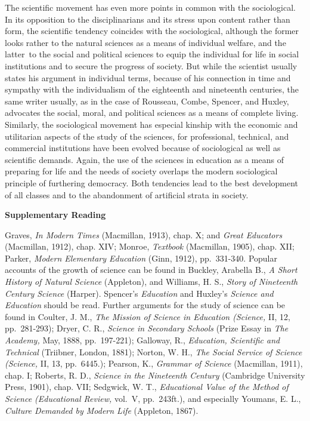 \documentclass[]{book}
\begin{document}
The scientific movement has even more points in common with the sociological. In its opposition to the disciplinarians and its stress upon content rather than form, the scientific tendency coincides with the sociological, although the former looks rather to the natural sciences as a means of individual welfare, and the latter~to the social and political sciences to equip the individual for life in social institutions and to secure the progress of society. But while the scientist usually states his argument in individual terms, because of his connection in time and sympathy with the individualism of the eighteenth and nineteenth centuries, the same writer usually, as in the case of Rousseau, Combe, Spencer, and Huxley, advocates the social, moral, and political sciences as a means of complete living. Similarly, the sociological movement has especial kinship with the economic and utilitarian aspects of the study of the sciences, for professional, technical, and commercial institutions have been evolved because of sociological as well as scientific demands. Again, the use of the sciences in education as a means of preparing for life and the needs of society overlaps the modern sociological principle of furthering democracy. Both tendencies lead to the best development of all classes and to the abandonment of artificial strata in society.

\textbf{Supplementary Reading}

Graves, \emph{In Modern Times} (Macmillan, 1913), chap. X; and \emph{Great Educators} (Macmillan, 1912), chap. XIV; Monroe, \emph{Textbook} (Macmillan, 1905), chap. XII; Parker, \emph{Modern Elementary Education} (Ginn, 1912), pp.~331-340. Popular accounts of the growth of science can be found in Buckley, Arabella B., \emph{A Short History of Natural Science} (Appleton), and Williams, H. S., \emph{Story of Nineteenth Century Science} (Harper). Spencer's \emph{Education} and Huxley's \emph{Science and Education} should be read. Further arguments for the study of science can be found in Coulter, J. M., \emph{The Mission of Science in Education (Science,} II, 12, pp.~281-293); Dryer, C. R., \emph{Science in Secondary Schools} (Prize Essay in \emph{The Academy,} May, 1888, pp.~197-221); Galloway, R., \emph{Education, Scientific and Technical} (Triibner, London, 1881); Norton, W. H., \emph{The Social Service of Science (Science,} II, 13, pp.~6445.); Pearson, K., \emph{Grammar of Science} (Macmillan, 1911), chap. I; Roberts, R. D., \emph{Science in the Nineteenth Century} (Cambridge University Press, 1901), chap. VII; Sedgwick, W. T., \emph{Educational Value of the Method of Science (Educational Review,} vol.~V, pp.~243ft.), and especially Youmans, E. L., \emph{Culture Demanded by Modern Life} (Appleton, 1867).
\end{document}
